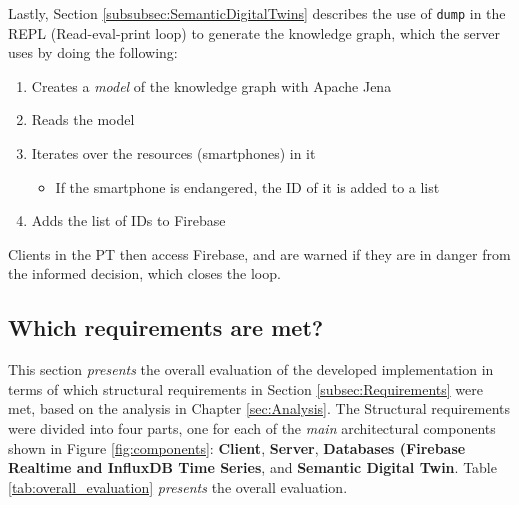 \documentclass{article}
\begin{document}
Lastly, Section \ref{subsubsec:SemanticDigitalTwins} describes the use of \verb|dump| in the REPL (Read-eval-print loop) to generate the knowledge graph, which the server uses by doing the following:
\begin{enumerate}
    \item Creates a \emph{model} of the knowledge graph with Apache Jena
    \item Reads the model
    \item Iterates over the resources (smartphones) in it
    \begin{itemize}
        \item If the smartphone is endangered, the ID of it is added to a list 
    \end{itemize}
    \item Adds the list of IDs to Firebase
\end{enumerate}

Clients in the PT then access Firebase, and are warned if they are in danger from the informed decision, which closes the loop.

\subsection{Which requirements are met?}\label{subsec:WhichRequirements}
This section \emph{presents} the overall evaluation of the developed implementation in terms of which structural requirements in Section \ref{subsec:Requirements} were met, based on the analysis in Chapter \ref{sec:Analysis}. The Structural requirements were divided into four parts, one for each of the \emph{main} architectural components shown in Figure \ref{fig:components}: \textbf{Client}, \textbf{Server}, \textbf{Databases (\textbf{Firebase Realtime} and \textbf{InfluxDB Time Series}}, and \textbf{Semantic Digital Twin}. Table \ref{tab:overall_evaluation} \emph{presents} the overall evaluation.
\end{document}
